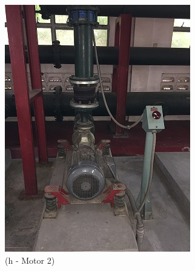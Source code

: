 \begin{figure}
\begin{minipage}[b]{0.22\linewidth}
	\includegraphics[width=\textwidth]{figures/asv_visual_motor2}
	\caption*{(h - Motor 2)}
\end{minipage}
	\hspace{0.03cm}
\begin{minipage}[b]{0.22\linewidth}

\end{minipage}
\end{figure}
